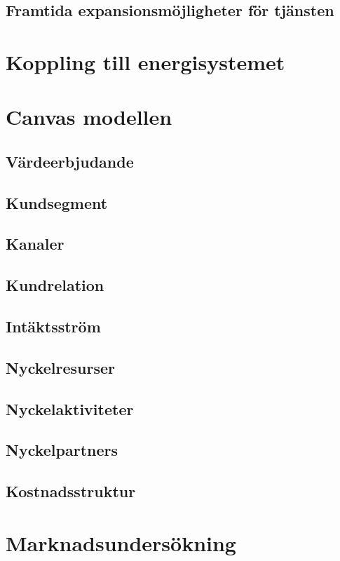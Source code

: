 \documentclass[10pt,a4paper,oneside]{article}
\begin{document}
\subsection{Framtida expansionsmöjligheter för tjänsten }
\newpage

\section{Koppling till energisystemet}
\newpage

\section{Canvas modellen}
\subsection{Värdeerbjudande}
\subsection{Kundsegment}
\subsection{Kanaler}
\subsection{Kundrelation}
\subsection{Intäktsström}
\subsection{Nyckelresurser}
\subsection{Nyckelaktiviteter}
\subsection{Nyckelpartners}
\subsection{Kostnadsstruktur}
\newpage

\section{Marknadsundersökning}
\newpage
\end{document}
